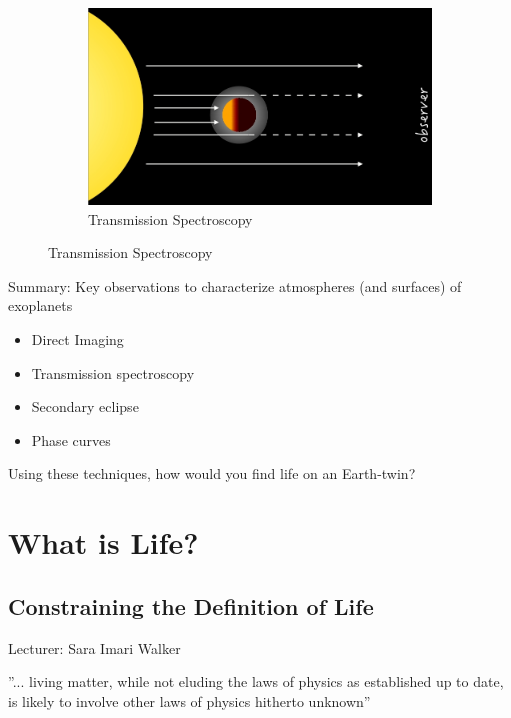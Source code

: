 \documentclass[]{article}
\begin{document}
\begin{figure}[H]
\begin{subfigure}[t]{0.3\textwidth}
	\end{subfigure}
	\begin{subfigure}[t]{0.3\textwidth}
		\caption{Transmission Spectroscopy}\label{fig:transiting:planets3}
		\includegraphics[width=\textwidth]{TransitingPlanets3}
	\end{subfigure}
\end{figure}
	

Summary: Key observations to characterize atmospheres (and surfaces) of exoplanets
\begin{itemize}
	\item Direct Imaging
	\item  Transmission spectroscopy
	\item  Secondary eclipse
	\item  Phase curves
\end{itemize}
Using these techniques, how would you find life on an Earth-twin?

\cite{sagan1993search}
\cite{kaltenegger2017characterize}
\cite{fujii2018exoplanet}

\cite{robinson2011earth}

\cite{deming2013infrared}
\cite{knutson2007map}

\section{What is Life?}

\subsection{Constraining the Definition of Life}

Lecturer:  Sara Imari Walker

''... living matter, while not eluding the laws of physics as established up to date, is likely to involve other laws of physics hitherto unknown''\cite{schrodinger1944life}
\end{document}
